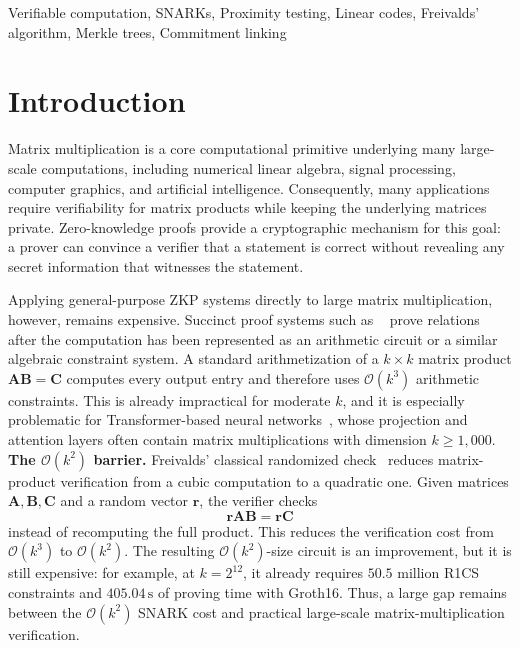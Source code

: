 \documentclass[conference,compsoc]{IEEEtran}
\newcommand{\mat}{\mathbf}          %
\newcommand{\vect}{\mathbf}         %
\theoremstyle{plain}
\theoremstyle{definition}
\theoremstyle{remark}
\begin{document}
\begin{IEEEkeywords}
Verifiable computation, SNARKs, Proximity testing, Linear codes, Freivalds' algorithm, Merkle trees, Commitment linking
\end{IEEEkeywords}

\section{Introduction}
\label{sec:intro}

Matrix multiplication is a core computational primitive underlying many large-scale computations, including numerical linear algebra, signal processing, computer graphics, and artificial intelligence.  Consequently, many applications require verifiability for matrix products while keeping the underlying matrices private.  Zero-knowledge proofs provide a cryptographic mechanism for this goal:
a prover can convince a verifier that a statement is correct without revealing any secret information that witnesses the statement.

Applying general-purpose ZKP systems directly to large matrix multiplication, however, remains expensive.  Succinct proof systems such as ~\cite{groth2016size, plonk, maller2019sonic, chiesa2020marlin} prove relations after the computation has been represented as an arithmetic circuit or a similar algebraic constraint system.  
A standard arithmetization of a \(k\times k\) matrix product \(\mat{A}\mat{B}=\mat{C}\) computes every output
entry and therefore uses \(\mathcal{O}(k^3)\) arithmetic constraints.  This is
already impractical for moderate \(k\), and it is especially problematic for
Transformer-based neural networks~\cite{transformer, bert, GPT3}, whose projection and attention layers often
contain matrix multiplications with dimension \(k\ge 1{,}000\). \\

\noindent\textbf{The \(\mathcal{O}(k^2)\) barrier.}
Freivalds' classical randomized check~\cite{freivalds1977probabilistic} reduces
matrix-product verification from a cubic computation to a quadratic one.  Given
matrices \(\mat{A},\mat{B},\mat{C}\) and a random vector \(\vect{r}\), the
verifier checks
\[
  \vect{r}\mat{A}\mat{B}=\vect{r}\mat{C}
\]
instead of recomputing the full product.  This reduces the verification cost
from \(\mathcal{O}(k^3)\) to \(\mathcal{O}(k^2)\).  The resulting
\(\mathcal{O}(k^2)\)-size circuit is an improvement, but it is still expensive:
for example, at \(k=2^{12}\), it already requires \(50.5\) million R1CS
constraints and \(405.04\,\text{s}\) of proving time with Groth16.  Thus, a large gap remains
between the \(\mathcal{O}(k^2)\) SNARK cost and practical large-scale
matrix-multiplication verification. \\
\end{document}
